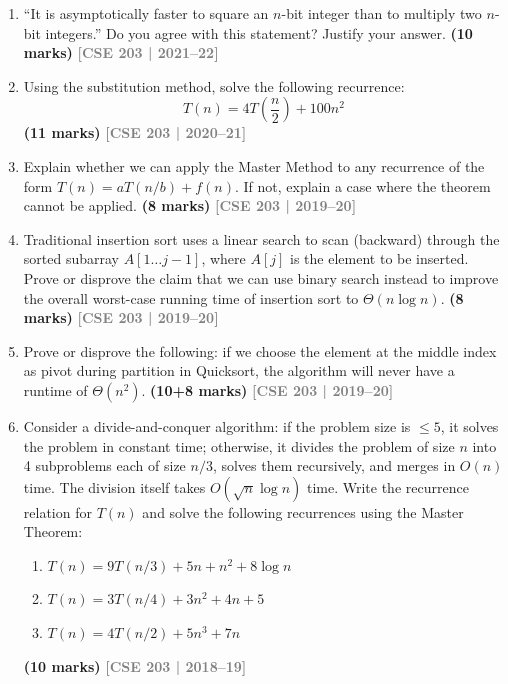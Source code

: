 \documentclass[12pt,a3paper]{article}
\newcommand{\yr}[1]{\hfill\textcolor{gray}{\small\textbf{[#1]}}}
\newcommand{\mk}[1]{\textcolor{orange!70!black}{\small\textbf{(#1 marks)}}}
\begin{document}
\begin{enumerate}
\begin{center}
\end{center}

\item ``It is asymptotically faster to square an $n$-bit integer than to multiply two $n$-bit integers.'' Do you agree with this statement? Justify your answer. \mk{10}
\yr{CSE 203 | 2021--22}

\item Using the substitution method, solve the following recurrence:
\[ T(n) = 4T\!\left(\frac{n}{2}\right) + 100n^2 \]
\mk{11}
\yr{CSE 203 | 2020--21}

\item Explain whether we can apply the Master Method to any recurrence of the form $T(n) = aT(n/b) + f(n)$. If not, explain a case where the theorem cannot be applied. \mk{8}
\yr{CSE 203 | 2019--20}

\item Traditional insertion sort uses a linear search to scan (backward) through the sorted subarray $A[1\ldots j-1]$, where $A[j]$ is the element to be inserted. Prove or disprove the claim that we can use binary search instead to improve the overall worst-case running time of insertion sort to $\Theta(n \log n)$. \mk{8}
\yr{CSE 203 | 2019--20}

\item Prove or disprove the following: if we choose the element at the middle index as pivot during partition in Quicksort, the algorithm will never have a runtime of $\Theta(n^2)$. \mk{10+8}
\yr{CSE 203 | 2019--20}

\item Consider a divide-and-conquer algorithm: if the problem size is $\leq 5$, it solves the problem in constant time; otherwise, it divides the problem of size $n$ into 4 subproblems each of size $n/3$, solves them recursively, and merges in $O(n)$ time. The division itself takes $O(\sqrt{n} \log n)$ time. Write the recurrence relation for $T(n)$ and solve the following recurrences using the Master Theorem:
\begin{enumerate}
  \item $T(n) = 9T(n/3) + 5n + n^2 + 8\log n$
  \item $T(n) = 3T(n/4) + 3n^2 + 4n + 5$
  \item $T(n) = 4T(n/2) + 5n^3 + 7n$
\end{enumerate}
\mk{10}
\yr{CSE 203 | 2018--19}


\end{enumerate}
\end{document}
